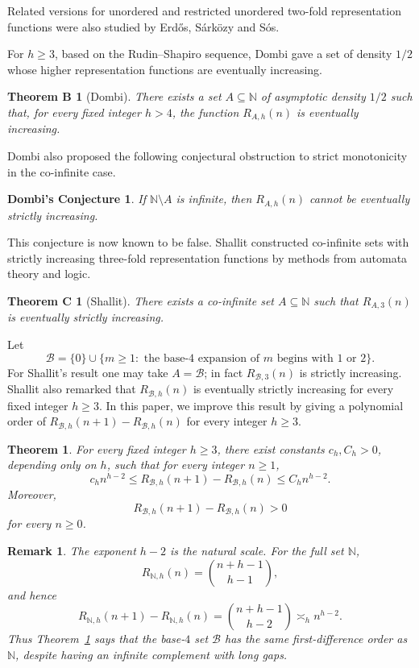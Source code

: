 \documentclass[10pt,a4paper]{amsart}
\newtheorem{theorem}{Theorem}[section]
\newtheorem*{theoremB}{Theorem B}
\newtheorem*{theoremC}{Theorem C}
\newtheorem*{conjectureD}{Dombi's Conjecture}
\newtheorem*{remarkintro}{Remark}
\newcommand{\BaseB}{\mathcal B}
\begin{document}
Related versions for unordered and restricted unordered two-fold representation functions were also studied by Erd\H{o}s, S\'{a}rk\"{o}zy and S\'{o}s.

For $h\ge 3$, based on the Rudin--Shapiro sequence, Dombi \cite{Dombi} gave a set of density $1/2$ whose higher representation functions are eventually increasing.

\begin{theoremB}[Dombi]
There exists a set $A\subseteq \mathbb N$ of asymptotic density $1/2$ such that, for every fixed integer $h>4$, the function $R_{A,h}(n)$ is eventually increasing.
\end{theoremB}

Dombi \cite{Dombi} also proposed the following conjectural obstruction to strict monotonicity in the co-infinite case.

\begin{conjectureD}
If $\mathbb N\setminus A$ is infinite, then $R_{A,h}(n)$ cannot be eventually strictly increasing.
\end{conjectureD}

This conjecture is now known to be false. Shallit \cite{ShallitDombi} constructed co-infinite sets with strictly increasing three-fold representation functions by methods from automata theory and logic.

\begin{theoremC}[Shallit]
There exists a co-infinite set $A\subseteq \mathbb N$ such that $R_{A,3}(n)$ is eventually strictly increasing.
\end{theoremC}

Let
\[
\BaseB=\{0\}\cup\{m\ge 1:\text{ the base-4 expansion of }m\text{ begins with }1\text{ or }2\}.
\]
For Shallit's result one may take $A=\BaseB$; in fact $R_{\BaseB,3}(n)$ is strictly increasing.
Shallit also remarked that $R_{\BaseB,h}(n)$ is eventually strictly increasing for every fixed integer $h\ge 3$.
In this paper, we improve this result by giving a polynomial order of
$R_{\BaseB,h}(n+1)-R_{\BaseB,h}(n)$ for every integer $h\ge 3$.


\begin{theorem}\label{thm:main}
For every fixed integer $h\ge 3$, there exist constants $c_h,C_h>0$, depending only on $h$, such that for every integer $n\ge 1$,
\[
 c_h n^{h-2}\le R_{\BaseB,h}(n+1)-R_{\BaseB,h}(n)\le C_h n^{h-2}.
\]
Moreover,
\[
 R_{\BaseB,h}(n+1)-R_{\BaseB,h}(n)>0
\]
for every $n\ge 0$.
\end{theorem}


\begin{remarkintro}
The exponent $h-2$ is the natural scale. For the full set $\mathbb N$,
\[
R_{\mathbb N,h}(n)=\binom{n+h-1}{h-1},
\]
and hence
\[
R_{\mathbb N,h}(n+1)-R_{\mathbb N,h}(n)
=\binom{n+h-1}{h-2}\asymp_h n^{h-2}.
\]
Thus Theorem~\ref{thm:main} says that the base-$4$ set $\BaseB$ has the same first-difference order as $\mathbb N$, despite having an infinite complement with long gaps.
\end{remarkintro}
\end{document}
